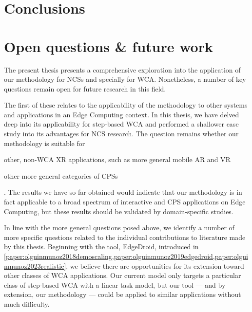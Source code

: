 \section{Conclusions}

\section{Open questions \& future work}

The present thesis presents a comprehensive exploration into the application of our methodology for \glspl{NCS} and specially for \gls{WCA}.
Nonetheless, a number of key questions remain open for future research in this field.

The first of these relates to the applicability of the methodology to other systems and applications in an Edge Computing context.
In this thesis, we have delved deep into its applicability for step-based \gls{WCA} and performed a shallower case study into its advantages for \gls{NCS} research.
The question remains whether our methodology is suitable for
\begin{inlineenum}
    \item other, non-\gls{WCA} \gls{XR} applications, such as more general mobile \gls{AR} and \gls{VR}
    \item other more general categories of \glspl{CPS}
\end{inlineenum}.
The results we have so far obtained would indicate that our methodology is in fact applicable to a broad spectrum of interactive and \gls{CPS} applications on Edge Computing, but these results should be validated by domain-specific studies.

In line with the more general questions posed above, we identify a number of more specific questions related to the individual contributions to literature made by this thesis.
Beginning with the tool, EdgeDroid, introduced in \cref{paper:olguinmunoz2018demoscaling,paper:olguinmunoz2019edgedroid,paper:olguinmunoz2023realistic}, we believe there are opportunities for its extension toward other classes of \gls{WCA} applications.
Our current model only targets a particular class of step-based \gls{WCA} with a linear task model, but our tool --- and by extension, our methodology --- could be applied to similar applications without much difficulty.

